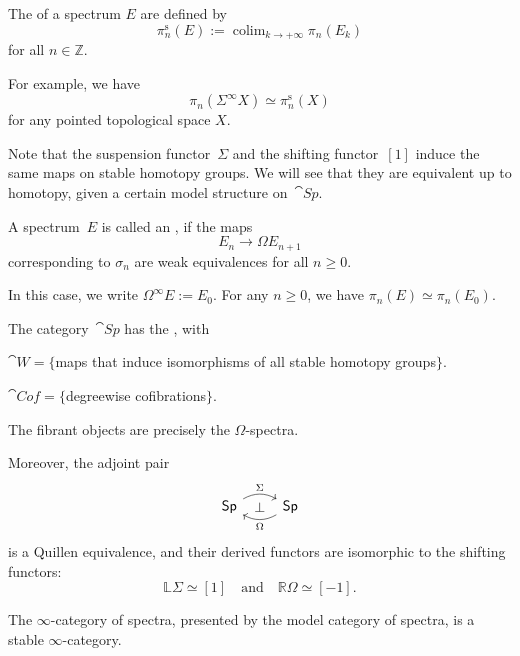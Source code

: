 \begin{definition}
    The  of a spectrum $E$ are defined by 
    \[\pi_n^{\mathrm s}(E):=
    \mathop{\operatorname{colim}}_{k\to+\infty} \pi_n(E_k)\]
    for all $n\in\mathbb{Z}$.
\end{definition}

For example, we have 
\[ \pi_n(\Sigma^\infty X)\simeq\pi_n^{\mathrm s}(X) \]
for any pointed topological space $X$.

Note that the suspension functor~$\Sigma$
and the shifting functor~$[1]$
induce the same maps on stable homotopy groups.
We will see that they are equivalent up to homotopy,
given a certain model structure on~$\cat{Sp}$.

\begin{definition}
    A spectrum~$E$ is called an ,
    if the maps 
    \[E_n\to\Omega E_{n+1}\]
    corresponding to $\sigma_n$
    are weak equivalences for all $n\geq0$.
\end{definition}

In this case, we write $\Omega^\infty E:=E_0$.
For any $n\geq0$, we have $\pi_n(E)\simeq\pi_n(E_0)$.

\begin{theorem}
    The category~$\cat{Sp}$ has the , with 
    \begin{itms}
        \item $\cat{W}=\{$maps that induce isomorphisms of all
        stable homotopy groups$\}$.
        \item $\cat{Cof}=\{$degreewise cofibrations$\}$.
        \item The fibrant objects are precisely the $\Omega$-spectra.
    \end{itms}
    Moreover, the adjoint pair 
    \[\begin{tikzcd}
        \cat{Sp}
        \ar[r,bend left,"\Sigma"]
        \ar[r,phantom,"\bot"] &
        \cat{Sp}
        \ar[l,bend left,"\Omega"]
    \end{tikzcd}\]
    is a Quillen equivalence, and their derived functors
    are isomorphic to the shifting functors:
    \[ \mathbb{L}\Sigma\simeq[1]
    \quad\text{and}\quad
    \mathbb{R}\Omega\simeq[-1]. \]
\end{theorem}

\begin{corollary}
    The $\infty$-category of spectra,
    presented by the model category of spectra,
    is a stable $\infty$-category.
\end{corollary}


